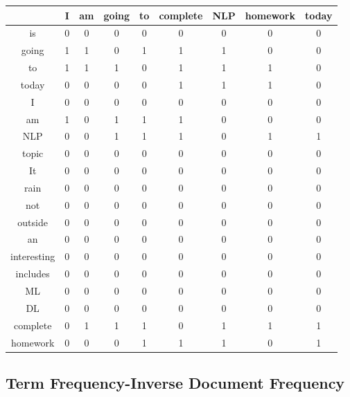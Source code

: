 \begin{center}
\begin{tabular}{||c|| c c c c c c c c||}
\hline
&I & am	 & going & to & complete & NLP & homework & today\\
\hline
is&0&0&0&0&0&0&0&0 \\
going&1&1&0&1&1&1&0&0\\
to&1&1&1&0&1&1&1&0\\
today&0&0&0&0&1&1&1&0\\
I&0&0&0&0&0&0&0&0\\
am&1&0&1&1&1&0&0&0\\
NLP&0&0&1&1&1&0&1&1\\
topic&0&0&0&0&0&0&0&0\\
It&0&0&0&0&0&0&0&0\\
rain&0&0&0&0&0&0&0&0\\
not&0&0&0&0&0&0&0&0\\
outside&0&0&0&0&0&0&0&0\\
an&0&0&0&0&0&0&0&0\\
interesting&0&0&0&0&0&0&0&0\\
includes&0&0&0&0&0&0&0&0\\
ML&0&0&0&0&0&0&0&0\\
DL&0&0&0&0&0&0&0&0\\
complete&0&1&1&1&0&1&1&1\\
homework&0&0&0&1&1&1&0&1\\
\hline
\end{tabular}
\end{center}
\subsection{Term Frequency-Inverse Document Frequency}
